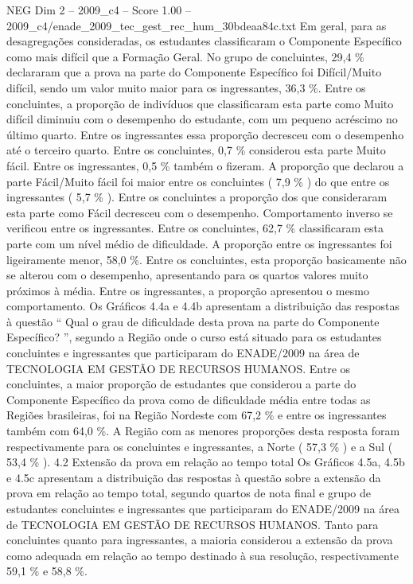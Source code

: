 \begin{textsample}{NEG Dim 2 – 2009\_c4 – Score 1.00 – 2009\_c4/enade\_2009\_tec\_gest\_rec\_hum\_30bdeaa84c.txt}
Em geral, para as desagregações consideradas, os estudantes classificaram o Componente Específico como mais difícil que a Formação Geral.
No grupo de concluintes, 29,4 \% declararam que a prova na parte do Componente Específico foi Difícil/Muito difícil, sendo um valor muito maior para os ingressantes, 36,3 \%.
Entre os concluintes, a proporção de indivíduos que classificaram esta parte como Muito difícil diminuiu com o desempenho do estudante, com um pequeno acréscimo no último quarto.
Entre os ingressantes essa proporção decresceu com o desempenho até o terceiro quarto.
Entre os concluintes, 0,7 \% considerou esta parte Muito fácil.
Entre os ingressantes, 0,5 \% também o fizeram.
A proporção que declarou a parte Fácil/Muito fácil foi maior entre os concluintes ( 7,9 \% ) do que entre os ingressantes ( 5,7 \% ).
Entre os concluintes a proporção dos que consideraram esta parte como Fácil decresceu com o desempenho.
Comportamento inverso se verificou entre os ingressantes.
Entre os concluintes, 62,7 \% classificaram esta parte com um nível médio de dificuldade.
A proporção entre os ingressantes foi ligeiramente menor, 58,0 \%.
Entre os concluintes, esta proporção basicamente não se alterou com o desempenho, apresentando para os quartos valores muito próximos à média.
Entre os ingressantes, a proporção apresentou o mesmo comportamento.
Os Gráficos 4.4a e 4.4b apresentam a distribuição das respostas à questão “ Qual o grau de dificuldade desta prova na parte do Componente Específico? ”, segundo a Região onde o curso está situado para os estudantes concluintes e ingressantes que participaram do ENADE/2009 na área de TECNOLOGIA EM GESTÃO DE RECURSOS HUMANOS.
Entre os concluintes, a maior proporção de estudantes que considerou a parte do Componente Específico da prova como de dificuldade média entre todas as Regiões brasileiras, foi na Região Nordeste com 67,2 \% e entre os ingressantes também com 64,0 \%.
A Região com as menores proporções desta resposta foram respectivamente para os concluintes e ingressantes, a Norte ( 57,3 \% ) e a Sul ( 53,4 \% ). 4.2 Extensão da prova em relação ao tempo total Os Gráficos 4.5a, 4.5b e 4.5c apresentam a distribuição das respostas à questão sobre a extensão da prova em relação ao tempo total, segundo quartos de nota final e grupo de estudantes concluintes e ingressantes que participaram do ENADE/2009 na área de TECNOLOGIA EM GESTÃO DE RECURSOS HUMANOS.
Tanto para concluintes quanto para ingressantes, a maioria considerou a extensão da prova como adequada em relação ao tempo destinado à sua resolução, respectivamente 59,1 \% e 58,8 \%.

\end{textsample}
